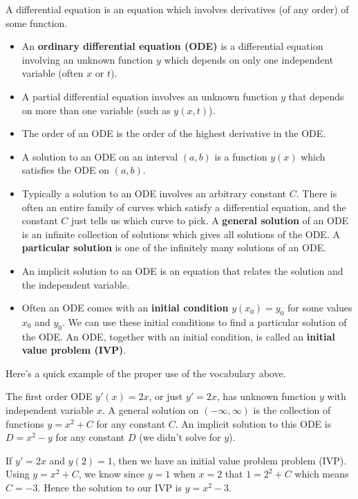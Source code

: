 \begin{definition}
A differential equation is an equation which involves derivatives (of any order) of some function.
\begin{itemize}
 \item An \textbf{ordinary differential equation (ODE)} is a differential equation involving an unknown function $y$ which depends on only one independent variable (often $x$ or $t$). 
 \item A partial differential equation involves an unknown function $y$ that depends on more than one variable (such as $y(x,t)$). 
 \item The order of an ODE is the order of the highest derivative in the ODE. 
 \item A solution to an ODE on an interval $(a,b)$ is a function $y(x)$ which satisfies the ODE on $(a,b)$. 
 \item Typically a solution to an ODE involves an arbitrary constant $C$. There is often an entire family of curves which satisfy a differential equation, and the constant $C$ just tells us which curve to pick. A \textbf{general solution} of an ODE is an infinite collection of solutions which gives all solutions of the ODE. A \textbf{particular solution} is one of the infinitely many solutions of an ODE. 
 \item An implicit solution to an ODE is an equation that relates the solution and the independent variable.
 \item Often an ODE comes with an \textbf{initial condition} $y(x_0)=y_0$ for some values $x_0$ and $y_0$. We can use these initial conditions to find a particular solution of the ODE. An ODE, together with an initial condition, is called an \textbf{initial value problem (IVP)}.  
\end{itemize}
\end{definition}



Here's a quick example of the proper use of the vocabulary above.



\begin{example}
The first order ODE $y'(x) = 2x$, or just $y'=2x$, has unknown function $y$ with independent variable $x$. A general solution on $(-\infty,\infty)$ is the collection of functions $y=x^2+C$ for any constant $C$. An implicit solution to this ODE is $D=x^2-y$ for any constant $D$ (we didn't solve for $y$). 

If $y'=2x$ and $y(2)=1$, then we have an initial value problem problem (IVP). Using $y=x^2+C$, we know since $y=1$ when $x=2$ that $1=2^2+C$ which means $C=-3$. Hence the solution to our IVP is $y=x^2-3$.
\end{example}



